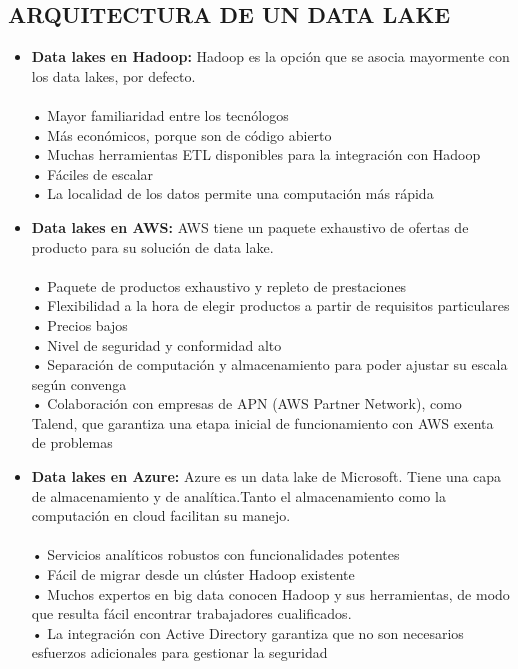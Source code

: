 \documentclass[%
 reprint,
 amsmath,amssymb,
 aps,
]{revtex4-1}
\begin{document}
\subsection{ARQUITECTURA DE UN DATA LAKE}
\begin{itemize}
	\item \textbf{ Data lakes en Hadoop:} Hadoop es la opción que se asocia mayormente con los data lakes, por defecto. \\\\
• Mayor familiaridad entre los tecnólogos \\
• Más económicos, porque son de código abierto \\
• Muchas herramientas ETL disponibles para la integración con Hadoop \\
• Fáciles de escalar \\
• La localidad de los datos permite una computación más rápida

	\item  \textbf{Data lakes en AWS:} AWS tiene un paquete exhaustivo de ofertas de producto para su solución de data lake.\\\\
• Paquete de productos exhaustivo y repleto de prestaciones\\
• Flexibilidad a la hora de elegir productos a partir de requisitos particulares\\
• Precios bajos\\
• Nivel de seguridad y conformidad alto\\
• Separación de computación y almacenamiento para poder ajustar su escala según convenga\\
• Colaboración con empresas de APN (AWS Partner Network), como Talend, que garantiza una etapa inicial de funcionamiento con AWS exenta de problemas

	\item  \textbf{ Data lakes en Azure:} Azure es un data lake de Microsoft. Tiene una capa de almacenamiento y de analítica.Tanto el almacenamiento como la computación en cloud facilitan su manejo.\\\\
• Servicios analíticos robustos con funcionalidades potentes\\
• Fácil de migrar desde un clúster Hadoop existente\\
• Muchos expertos en big data conocen Hadoop y sus herramientas, de modo que resulta fácil encontrar trabajadores cualificados.\\
• La integración con Active Directory garantiza que no son necesarios esfuerzos adicionales para gestionar la seguridad\\
\end{itemize}
\end{document}
